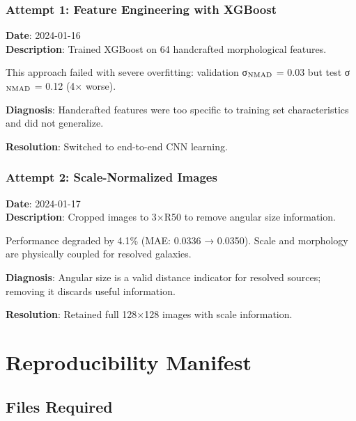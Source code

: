 \documentclass[12pt,modern,linenumbers]{aastex7}
\begin{document}
\subsubsection{Attempt 1: Feature Engineering with XGBoost}
\textbf{Date}: 2024-01-16\\
\textbf{Description}: Trained XGBoost on 64 handcrafted morphological features.

\begin{warning}
This approach failed with severe overfitting: validation σ$_{\rm NMAD}$ = 0.03 
but test σ$_{\rm NMAD}$ = 0.12 (4× worse).
\end{warning}

\textbf{Diagnosis}: Handcrafted features were too specific to training set 
characteristics and did not generalize.

\textbf{Resolution}: Switched to end-to-end CNN learning.

\subsubsection{Attempt 2: Scale-Normalized Images}
\textbf{Date}: 2024-01-17\\
\textbf{Description}: Cropped images to 3×R50 to remove angular size information.

\begin{warning}
Performance degraded by 4.1\% (MAE: 0.0336 → 0.0350). Scale and morphology are 
physically coupled for resolved galaxies.
\end{warning}

\textbf{Diagnosis}: Angular size is a valid distance indicator for resolved 
sources; removing it discards useful information.

\textbf{Resolution}: Retained full 128×128 images with scale information.

\section{Reproducibility Manifest}

\subsection{Files Required}
\end{document}
